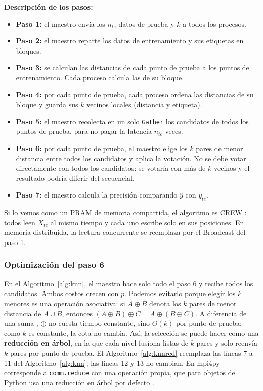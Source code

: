 \documentclass[11pt,a4paper]{article}
\newcommand{\nte}{n_{te}}
\newcommand{\Xte}{X_{te}}
\newcommand{\yte}{y_{te}}
\begin{document}
\textbf{Descripción de los pasos:}
\begin{itemize}
  \item \textbf{Paso 1:} el maestro envía los $\nte$ datos de prueba y $k$ a todos los procesos.
  \item \textbf{Paso 2:} el maestro reparte los datos de entrenamiento y sus etiquetas en bloques.
  \item \textbf{Paso 3:} se calculan las distancias de cada punto de prueba a los puntos de entrenamiento. Cada proceso calcula las de su bloque.
  \item \textbf{Paso 4:} por cada punto de prueba, cada proceso ordena las distancias de su bloque y guarda sus $k$ vecinos locales (distancia y etiqueta).
  \item \textbf{Paso 5:} el maestro recolecta en un solo \texttt{Gather} los candidatos de todos los puntos de prueba, para no pagar la latencia $\nte$ veces.
  \item \textbf{Paso 6:} por cada punto de prueba, el maestro elige los $k$ pares de menor distancia entre todos los candidatos y aplica la votación. No se debe votar directamente con todos los candidatos: se votaría con más de $k$ vecinos y el resultado podría diferir del secuencial.
  \item \textbf{Paso 7:} el maestro calcula la precisión comparando $\hat y$ con $\yte$.
\end{itemize}

Si lo vemos como un PRAM de memoria compartida, el algoritmo es CREW \cite{slides}: todos leen $\Xte$ al mismo tiempo y cada uno escribe solo en sus posiciones. En memoria distribuida, la lectura concurrente se reemplaza por el Broadcast del paso 1.

\subsubsection*{Optimización del paso 6}

En el Algoritmo~\ref{alg:knn}, el maestro hace solo todo el paso 6 y recibe todos los candidatos. Ambos costos crecen con $p$. Podemos evitarlo porque elegir los $k$ menores es una operación asociativa: si $A\oplus B$ denota los $k$ pares de menor distancia de $A\cup B$, entonces $(A\oplus B)\oplus C=A\oplus(B\oplus C)$. A diferencia de una suma \cite{slides}, $\oplus$ no cuesta tiempo constante, sino $O(k)$ por punto de prueba; como $k$ es constante, la cota no cambia. Así, la selección se puede hacer como una \textbf{reducción en árbol}, en la que cada nivel fusiona listas de $k$ pares y solo reenvía $k$ pares por punto de prueba. El Algoritmo~\ref{alg:knnred} reemplaza las líneas 7 a 11 del Algoritmo~\ref{alg:knn}; las líneas 12 y 13 no cambian. En mpi4py corresponde a \texttt{comm.reduce} con una operación propia, que para objetos de Python usa una reducción en árbol por defecto \cite{mpi4py}.
\end{document}
